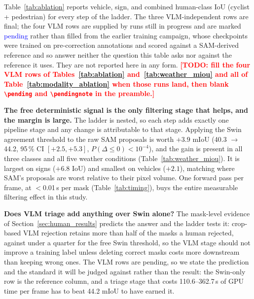 \documentclass[conference]{IEEEtran}
\newcommand{\pending}[1]{\textcolor{blue}{#1}}
\newcommand{\TODO}[1]{\textcolor{red}{\textbf{[TODO: #1]}}}
\begin{document}
Table~\ref{tab:ablation} reports vehicle, sign, and combined human-class IoU (cyclist + pedestrian) for
every step of the ladder. The three VLM-independent rows are final; the four VLM rows are supplied by
runs still in progress and are marked \pending{pending} rather than filled from the earlier training
campaign, whose checkpoints were trained on pre-correction annotations and scored against a
SAM-derived reference and so answer neither the question this table asks nor against the reference it
uses. They are not reported here in any form.
\TODO{fill the four VLM rows of Tables~\ref{tab:ablation} and~\ref{tab:weather_miou} and all of
Table~\ref{tab:modality_ablation} when those runs land, then blank \texttt{\textbackslash pending} and
\texttt{\textbackslash pendingnote} in the preamble.}

\textbf{The free deterministic signal is the only filtering stage that helps, and the margin is large.}
The ladder is nested, so each step adds exactly one pipeline stage and any change is attributable to
that stage. Applying the Swin agreement threshold to the raw SAM proposals is worth
$+3.9$ mIoU (40.3 $\to$ 44.2, 95\,\% CI $[+2.5, +5.3]$, $P(\Delta\leq0)<10^{-4}$), and the gain is
present in all three classes and all five weather conditions (Table~\ref{tab:weather_miou}). It is
largest on signs ($+6.8$ IoU) and smallest on vehicles ($+2.1$), matching where SAM's proposals are
worst relative to their pixel volume. One forward pass per frame, at $<$0.01\,s per mask
(Table~\ref{tab:timing}), buys the entire measurable filtering effect in this study.

\textbf{Does VLM triage add anything over Swin alone?}
The mask-level evidence of Section~\ref{sec:human_results} predicts the answer and the ladder tests it:
crop-based VLM rejection retains more than half of the masks a human rejected, against under a quarter
for the free Swin threshold, so the VLM stage should not improve a training label unless deleting
correct masks costs more downstream than keeping wrong ones. The VLM rows are pending, so we state the
prediction and the standard it will be judged against rather than the result: the Swin-only row is the
reference column, and a triage stage that costs 110.6--362.7\,s of GPU time per frame has to beat 44.2
mIoU to have earned it.
\end{document}
